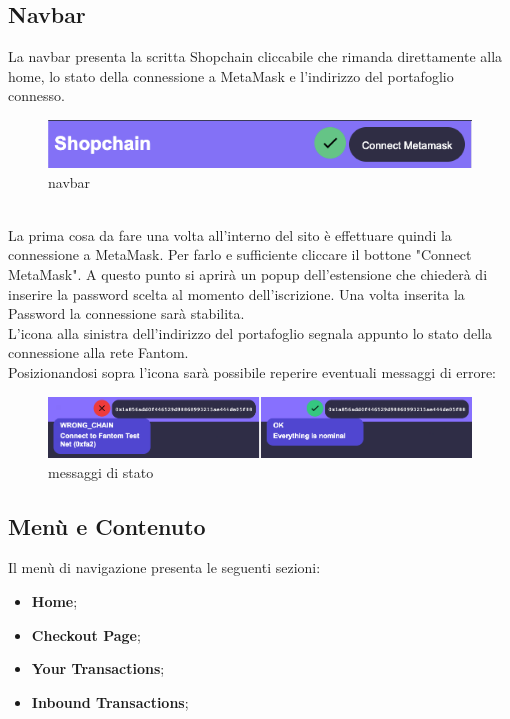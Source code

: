    \subsection{Navbar}
    La navbar presenta la scritta Shopchain cliccabile che rimanda direttamente alla home, lo stato della connessione a MetaMask e l'indirizzo del portafoglio connesso.
    \begin{figure}[H]
        \centering
        \includegraphics[scale=0.5]{immagini/navbar.png}
        \caption{navbar}
    \end{figure}
    \textbf{}\\
    La prima cosa da fare una volta all'interno del sito è effettuare quindi la connessione a MetaMask. Per farlo e sufficiente cliccare il bottone "Connect MetaMask". A questo punto si aprirà un popup dell'estensione che chiederà di inserire la password scelta al momento dell'iscrizione. Una volta inserita la Password la connessione sarà stabilita.\\
    L'icona alla sinistra dell'indirizzo del portafoglio segnala appunto lo stato della connessione alla rete Fantom\glo{}.\\
    Posizionandosi sopra l'icona sarà possibile reperire eventuali messaggi di errore:
    \begin{figure}[H]
        \centering
        \includegraphics[scale=0.4]{immagini/stateSignal.png}
        \caption{messaggi di stato}
    \end{figure}

    \subsection{Menù e Contenuto}
    Il menù di navigazione presenta le seguenti sezioni:
    \begin{itemize}
        \item \textbf{Home};
        \item \textbf{Checkout Page};
        \item \textbf{Your Transactions};
        \item \textbf{Inbound Transactions};
    \end{itemize}

